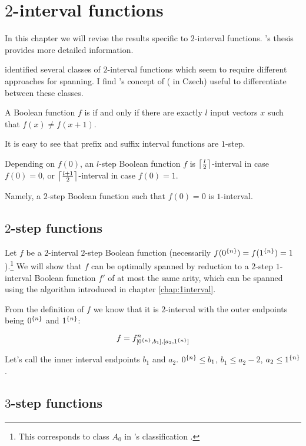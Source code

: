\chapter{\texorpdfstring{$2$}{2}-interval functions}

In this chapter we will revise the results specific to
$2$-interval functions.
\dubovsky{}'s
thesis \cite{Dubovsky2012}
provides more detailed information.

\dubovsky{} identified several classes
of $2$-interval functions \cite[p.~5]{Dubovsky2012}
which seem to require different approaches for spanning.
I find \husek{}'s concept of
 \cite[p.~13]{Husek2014}
( in Czech)
useful to differentiate between these classes.

\begin{definition}
A Boolean function $f$ is 
if and only if
there are exactly $l$ input vectors $x$ such that
$f(x) \neq f(x+1)$.
\end{definition}

It is easy to see that
prefix and suffix interval functions are $1$-step.

Depending on $f(0)$,
an $l$-step Boolean function $f$
is $\ceil*{\frac{l}{2}}$-interval in case $f(0) = 0$,
or $\ceil*{\frac{l+1}{2}}$-interval in case $f(0) = 1$.

Namely,
a $2$-step Boolean function such that $f(0) = 0$
is $1$-interval.

\section{\texorpdfstring{$2$}{2}-step functions}

Let $f$ be a $2$-interval $2$-step Boolean function
(necessarily $f(\rep{0}{n}) = f(\rep{1}{n})
= 1$).\footnote{This corresponds to class $A_0$
in \dubovsky{}'s classification
\cite[p.~5]{Dubovsky2012}.}
We will show that $f$
can be optimally spanned by reduction to
a $2$-step $1$-interval Boolean function $f'$
of at most the same arity,
which can be spanned using the algorithm introduced
in chapter \ref{chap:1interval}.

From the definition of $f$ we know that it is $2$-interval
with the outer endpoints being
$\rep{0}{n}$ and $\rep{1}{n}$:

\[
f = f^n_{\interval{\rep{0}{n}}{b_1},
\interval{a_2}{\rep{1}{n}}}
\]

Let's call the inner interval endpoints $b_1$ and $a_2$.
$\rep{0}{n} \leq b_1$,
$b_1 \leq a_2 - 2$,
$a_2 \leq \rep{1}{n}$.

\section{\texorpdfstring{$3$}{3}-step functions}

